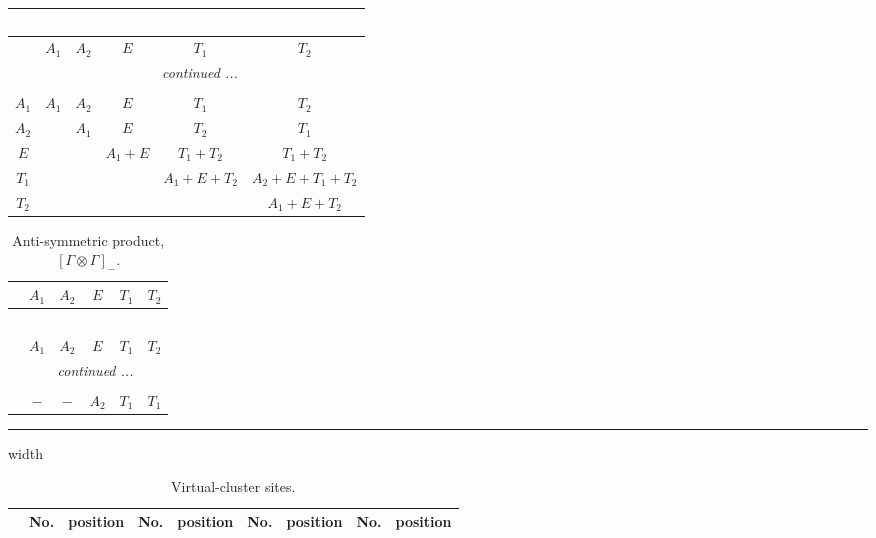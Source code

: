 \documentclass[fleqn,10pt,landscape]{article}
\begin{document}
\begin{itemize}
\begin{center}
\begin{longtable}{c|ccccc}
\multicolumn{5}{l}{\tablename\ \thetable{}} \\
 \hline \hline
 & $ A_{1} $ & $ A_{2} $ & $ E $ & $ T_{1} $ & $ T_{2} $ \\ \hline \endhead

 \hline \hline
\multicolumn{5}{r}{\footnotesize\it continued ...} \\ \endfoot

 \hline \hline
\multicolumn{5}{r}{} \\ \endlastfoot

$ A_{1} $ & $ A_{1} $ & $ A_{2} $ & $ E $ & $ T_{1} $ & $ T_{2} $ \\
$ A_{2} $ & $  $ & $ A_{1} $ & $ E $ & $ T_{2} $ & $ T_{1} $ \\
$ E $ & $  $ & $  $ & $ A_{1} + E $ & $ T_{1} + T_{2} $ & $ T_{1} + T_{2} $ \\
$ T_{1} $ & $  $ & $  $ & $  $ & $ A_{1} + E + T_{2} $ & $ A_{2} + E + T_{1} + T_{2} $ \\
$ T_{2} $ & $  $ & $  $ & $  $ & $  $ & $ A_{1} + E + T_{2} $ \\
\end{longtable}
\end{center}
\begin{center}
\renewcommand{\arraystretch}{1.0}
\begin{longtable}{cccccc}
\caption{Anti-symmetric product, $[\Gamma\otimes\Gamma]_-$.}
 \\
 \hline \hline
 & $ A_{1} $ & $ A_{2} $ & $ E $ & $ T_{1} $ & $ T_{2} $ \\ \hline \endfirsthead

\multicolumn{5}{l}{\tablename\ \thetable{}} \\
 \hline \hline
 & $ A_{1} $ & $ A_{2} $ & $ E $ & $ T_{1} $ & $ T_{2} $ \\ \hline \endhead

 \hline \hline
\multicolumn{5}{r}{\footnotesize\it continued ...} \\ \endfoot

 \hline \hline
\multicolumn{5}{r}{} \\ \endlastfoot

$  $ & $ - $ & $ - $ & $ A_{2} $ & $ T_{1} $ & $ T_{1} $ \\
\end{longtable}
\end{center}

 \hfil \hrule height 1mm width \textwidth \hfil

{
\scriptsize
\begin{center}
\renewcommand{\arraystretch}{1.7}
\begin{longtable}{ccccccccc}
\caption{Virtual-cluster sites.}
 \\
 \hline \hline
 & No. & position & No. & position & No. & position & No. & position \\ \hline \endfirsthead


\end{longtable}
\end{center}}
\end{itemize}
\end{document}
